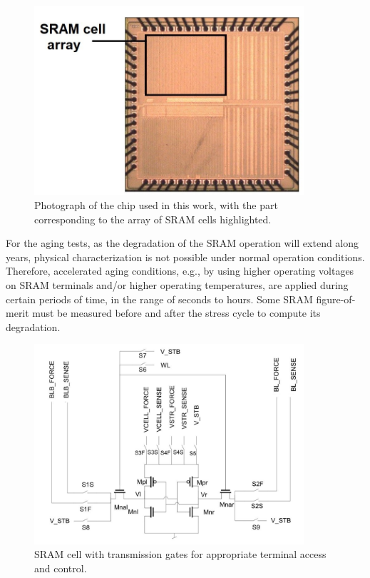 \begin{figure}[H]
    \centering
    \includegraphics[width=10cm]{images/KIPTsram.jpg}
    \caption{Photograph of the chip used in this work, with the part corresponding to the array of SRAM cells highlighted.}
    \label{fig:KIPTsram}
\end{figure}

For the aging tests, as the degradation of the SRAM operation will extend along years, physical characterization is not possible under normal operation conditions. Therefore, accelerated aging conditions, e.g., by using higher operating voltages on SRAM terminals and/or higher operating temperatures, are applied during certain periods of time, in the range of seconds to hours. Some SRAM figure-of-merit must be measured before and after the stress cycle to compute its degradation.

\begin{figure}[H]
    \centering
    \includegraphics[width=10cm]{images/KIPT cell modified.pdf}
    \caption{SRAM cell with transmission gates for appropriate terminal
access and control.}
    \label{fig:KIPTsramcell}
\end{figure}



